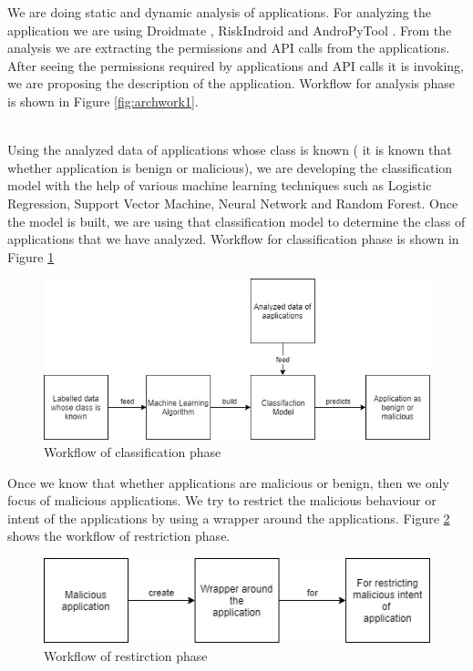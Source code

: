 We are doing static and dynamic analysis of applications. For analyzing the application we are using Droidmate \cite{jamrozik2016droidmate}, RiskIndroid \cite{merlo2017riskindroid} and AndroPyTool \cite{andropytoool}. From the analysis we are extracting the permissions and API calls from the applications. After seeing the permissions required by applications and API calls it is invoking, we are proposing the description of the application. Workflow for analysis phase is shown in Figure \ref{fig:archwork1}.

\\
Using the analyzed data of applications whose class is known ( it is known that whether application is benign or malicious), we are developing the classification model with the help of various machine learning techniques such as Logistic Regression, Support Vector Machine, Neural Network and Random Forest. Once the model is built, we are using that classification model to determine the class of applications that we have analyzed. Workflow for classification phase is shown in Figure \ref{fig:archwork2}
\begin{figure}[!h]
  \centering
  \includegraphics [scale=0.6] {archwork2.jpg}
  \caption{Workflow of classification phase}
  \label{fig:archwork2}
\end{figure}

Once we know that whether applications are malicious or benign, then we only focus of malicious applications. We try to restrict the malicious behaviour or intent of the applications by using a wrapper around the applications. Figure \ref{fig:archwork3} shows the workflow of restriction phase.

\begin{figure}[!h]
  \centering
  \includegraphics [scale=0.6] {archwork3.jpg}
  \caption{Workflow of restirction phase}
  \label{fig:archwork3}
\end{figure}




